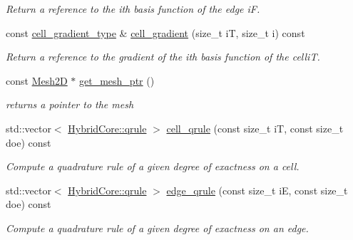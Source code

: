\begin{DoxyCompactItemize}
\begin{DoxyCompactList}\small\item\em Return a reference to the i\textquotesingle{}th basis function of the edge iF. \end{DoxyCompactList}\item 
const \hyperlink{classHArDCore2D_1_1HybridCore_a41350d7c3ac5a5a5e932348d2c9d0750}{cell\+\_\+gradient\+\_\+type} \& \hyperlink{classHArDCore2D_1_1HybridCore_a710fc23b914623b90a2699ab4291e539}{cell\+\_\+gradient} (size\+\_\+t iT, size\+\_\+t i) const
\begin{DoxyCompactList}\small\item\em Return a reference to the gradient of the i\textquotesingle{}th basis function of the celliT. \end{DoxyCompactList}\item 
\mbox{\label{classHArDCore2D_1_1HybridCore_a761aa45132a8857c632f30f92b349bfc}} 
const \hyperlink{classHArDCore2D_1_1Mesh2D}{Mesh2D} $\ast$ \hyperlink{classHArDCore2D_1_1HybridCore_a761aa45132a8857c632f30f92b349bfc}{get\+\_\+mesh\+\_\+ptr} ()
\begin{DoxyCompactList}\small\item\em returns a pointer to the mesh \end{DoxyCompactList}\item 
std\+::vector$<$ \hyperlink{structHArDCore2D_1_1HybridCore_1_1qrule}{Hybrid\+Core\+::qrule} $>$ \hyperlink{classHArDCore2D_1_1HybridCore_a9ecd6ca61d4f9e3f3e3af81d8de394d0}{cell\+\_\+qrule} (const size\+\_\+t iT, const size\+\_\+t doe) const
\begin{DoxyCompactList}\small\item\em Compute a quadrature rule of a given degree of exactness on a cell. \end{DoxyCompactList}\item 
std\+::vector$<$ \hyperlink{structHArDCore2D_1_1HybridCore_1_1qrule}{Hybrid\+Core\+::qrule} $>$ \hyperlink{classHArDCore2D_1_1HybridCore_a448297d0d0afefe477815dfb7821b270}{edge\+\_\+qrule} (const size\+\_\+t iE, const size\+\_\+t doe) const
\begin{DoxyCompactList}\small\item\em Compute a quadrature rule of a given degree of exactness on an edge. \end{DoxyCompactList}\item 
\mbox{\label{classHArDCore2D_1_1HybridCore_a4571fff91492781ebb01849b1063e626}} 

\end{DoxyCompactItemize}
